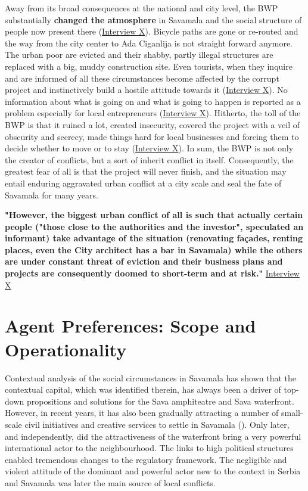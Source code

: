 \documentclass[11pt]{report}
\begin{document}
Away from its broad consequences at the national and city level, the BWP substantially \textbf{changed the atmosphere} in Savamala and the social structure of people now present there
(\href{InterviewX}{Interview X}).
Bicycle paths are gone or re-routed and the way from the city center to Ada Ciganlija is not straight forward anymore. The urban poor are evicted and their shabby, partly illegal structures are replaced with a big, muddy construction site. Even tourists, when they inquire and are informed of all these circumstances become affected by the corrupt project and instinctively build a hostile attitude towards it 
(\href{InterviewX}{Interview X}).
No information about what is going on and what is going to happen is reported as a problem especially for local entrepreneurs
(\href{InterviewX}{Interview X}).
Hitherto, the toll of the BWP is that it ruined a lot, created insecurity, covered the project with a veil of obscurity and secrecy, made things hard for local businesses and forcing them to decide whether to move or to stay
(\href{InterviewX}{Interview X}).
In sum, the BWP is not only the creator of conflicts, but a sort of inherit conflict in itself. Consequently, the greatest fear of all is that the project will never finish, and the situation may entail enduring aggravated urban conflict at a city scale and seal the fate of Savamala for many years.

\textbf{"However, the biggest urban conflict of all is such that actually certain people ("those close to the authorities and the investor", speculated an informant)  take advantage of the situation (renovating façades, renting places, even the City architect has a bar in Savamala) while the others are under constant threat of eviction and their business plans and projects are consequently doomed to short-term and at risk."} \href{InterviewX}{Interview X}

\section{Agent Preferences: Scope and Operationality}

Contextual analysis of the social circumstances in Savamala has shown that the contextual capital, which was identified therein, has always been a driver of top-down propositions and solutions for the Sava amphiteatre and Sava waterfront. However, in recent years, it has also been gradually attracting a number of small-scale civil initiatives and creative services to settle in Savamala (\href{ref}{\citealt{cvetinovic_engine_2013}}).
Only later, and independently, did the attractiveness of the waterfront bring a very powerful international actor to the neighbourhood. The links to high political structures enabled tremendous changes to the regulatory framework. The negligible and violent attitude of the dominant and powerful actor new to the context in Serbia and Savamala was later the main source of local conflicts.
\\
\end{document}

